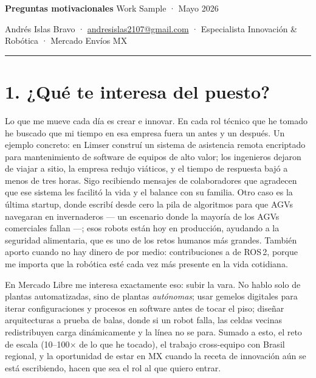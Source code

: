 \documentclass[11pt, letterpaper]{article}
\begin{document}
{\headingfont\Large\bfseries\color{meliblue} Preguntas motivacionales}\hfill
{\small\color{muted} Work Sample · Mayo 2026}

\vspace{0.2em}

{\small\color{muted} Andrés Islas Bravo \;·\; \href{mailto:andresislas2107@gmail.com}{andresislas2107@gmail.com} \;·\; \monofont Especialista Innovación \& Robótica · Mercado Envíos MX}

\vspace{0.4em}
{\color{meliyellowdark}\rule{\linewidth}{2.5pt}}
\vspace{0.6em}

\section*{1. ¿Qué te interesa del puesto?}

Lo que me mueve cada día es crear e innovar. En cada rol técnico que he tomado he buscado que mi tiempo en esa empresa fuera un antes y un después. Un ejemplo concreto: en Limser construí un sistema de asistencia remota encriptado para mantenimiento de software de equipos de alto valor; los ingenieros dejaron de viajar a sitio, la empresa redujo viáticos, y el tiempo de respuesta bajó a menos de tres horas. Sigo recibiendo mensajes de colaboradores que agradecen que ese sistema les facilitó la vida y el balance con su familia. Otro caso es la última startup, donde escribí desde cero la pila de algoritmos para que AGVs navegaran en invernaderos --- un escenario donde la mayoría de los AGVs comerciales fallan ---; esos robots están hoy en producción, ayudando a la seguridad alimentaria, que es uno de los retos humanos más grandes. También aporto cuando no hay dinero de por medio: contribuciones a  de ROS\,2, porque me importa que la robótica esté cada vez más presente en la vida cotidiana.

En Mercado Libre me interesa exactamente eso: subir la vara. No hablo solo de plantas automatizadas, sino de plantas \textit{autónomas}; usar gemelos digitales para iterar configuraciones y procesos en software antes de tocar el piso; diseñar arquitecturas a prueba de balas, donde si un robot falla, las celdas vecinas redistribuyen carga dinámicamente y la línea no se para. Sumado a esto, el reto de escala (10--100$\times$ de lo que he tocado), el trabajo cross-equipo con Brasil regional, y la oportunidad de estar en MX cuando la receta de innovación aún se está escribiendo, hacen que sea el rol al que quiero entrar.
\end{document}
